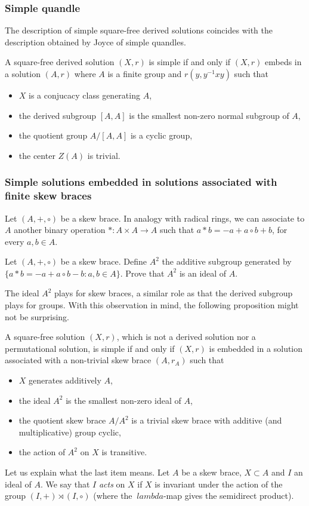 \subsubsection{Simple quandle}

The description of simple square-free derived solutions coincides with the description obtained by Joyce of simple quandles. 

\begin{proposition}
    A square-free derived solution $(X,r)$ is simple if and only if $(X,r)$ embeds in a solution $(A,r)$ where $A$ is a finite group and $r(y, y^{-1}xy)$ such that
    \begin{itemize}
        \item $X$ is a conjucacy class generating $A$,
        \item the derived subgroup $[A,A]$ is the smallest non-zero normal subgroup of $A$,
        \item the quotient group $A/[A,A]$ is a cyclic group,
        \item the center $Z(A)$ is trivial.
    \end{itemize}
\end{proposition}

\subsubsection{Simple solutions embedded in solutions associated with finite skew braces}

Let $(A,+,\circ)$ be a skew brace. In analogy with radical rings, we can associate to $A$ another binary operation $\ast:A\times A\to A$ such that $a\ast b = -a+a\circ b +b$, for every $a,b\in A$.

\begin{exercise}\label{ex:A2}
    Let $(A,+,\circ)$ be a skew brace. Define $A^2$ the additive subgroup generated by $\{a\ast b=-a+a\circ b - b \colon a,b\in A\}$. Prove that 
    $A^2$ is an ideal of $A$.
\end{exercise}

The ideal $A^2$ plays for skew braces, a similar role as that the derived subgroup plays for groups. With this observation in mind, the following proposition might not be surprising. 

\begin{proposition}
    A square-free solution $(X,r)$, which is not a derived solution nor a permutational solution, is simple if and only if $(X,r)$ is embedded in a solution associated with a non-trivial skew brace $(A,r_A)$ such that
    \begin{itemize}
        \item $X$ generates additively $A$,
        \item the ideal $A^2$ is the smallest non-zero ideal of $A$,
        \item the quotient skew brace $A/A^2$ is a trivial skew brace with additive (and multiplicative) group cyclic,
        \item the action of $A^2$ on $X$ is transitive.
    \end{itemize}
\end{proposition}

Let us explain what the last item means. Let $A$ be a skew brace, $X\subset A$ and $I$ an ideal of $A$. We say that $I$ \emph{acts} on $X$ if $X$ is invariant under the action of the group $(I,+)\rtimes (I,\circ)$ (where the $\ lambda$-map gives the semidirect product).